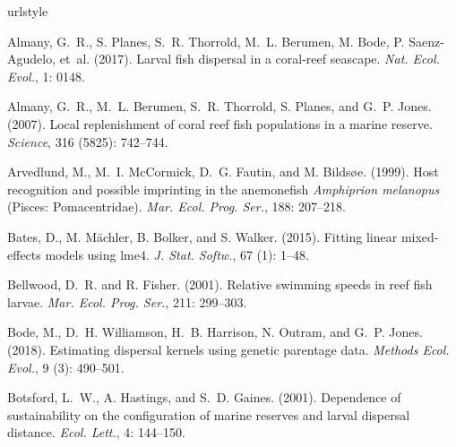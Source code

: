 \documentclass[12pt, oneside]{article}   	%
\begin{document}
\newpage{}

\newpage{}

\newcommand{\noop}[1]{}
\begin{thebibliography}{66}
\providecommand{\natexlab}[1]{#1}
\providecommand{\url}[1]{\texttt{#1}}
\expandafter\ifx\csname urlstyle\endcsname\relax
  \providecommand{\doi}[1]{doi: #1}\else
  \providecommand{\doi}{doi: \begingroup \urlstyle{rm}\Url}\fi

Almany, G.~R., S. Planes, S.~R. Thorrold, M.~L. Berumen, M. Bode, P. Saenz-Agudelo, et~al. (2017).
\newblock Larval fish dispersal in a coral-reef seascape.
\newblock \emph{Nat. Ecol. Evol.}, 1: 0148.

Almany, G.~R., M.~L. Berumen, S.~R. Thorrold, S. Planes, and G.~P. Jones. (2007).
\newblock Local replenishment of coral reef fish populations in a marine reserve.
\newblock \emph{Science}, 316 (5825): 742--744.

Arvedlund, M., M.~I. McCormick, D.~G. Fautin, and M. Bilds{\o}e. (1999).
\newblock Host recognition and possible imprinting in the anemonefish
  \textit{Amphiprion melanopus} (Pisces: Pomacentridae).
\newblock \emph{Mar. Ecol. Prog. Ser.}, 188: 207--218.

Bates, D., M. M{\"a}chler, B. Bolker, and S. Walker. (2015).
\newblock Fitting linear mixed-effects models using {lme4}.
\newblock \emph{J. Stat. Softw.}, 67 (1):
  1--48.

Bellwood, D.~R. and R. Fisher. (2001).
\newblock Relative swimming speeds in reef fish larvae.
\newblock \emph{Mar. Ecol. Prog. Ser.}, 211: 299--303.

Bode, M., D.~H. Williamson, H.~B. Harrison, N. Outram, and G.~P.
  Jones. (2018).
\newblock Estimating dispersal kernels using genetic parentage data.
\newblock \emph{Methods Ecol. Evol.}, 9 (3):
  490--501.

Botsford, L.~W., A. Hastings, and S.~D. Gaines. (2001).
\newblock Dependence of sustainability on the configuration of marine reserves
  and larval dispersal distance.
\newblock \emph{Ecol. Lett.}, 4: 144--150.


\end{thebibliography}
\end{document}

